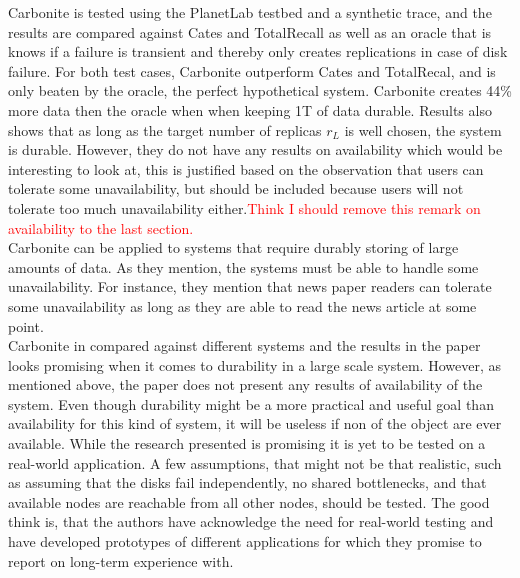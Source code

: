 \documentclass{article}
\begin{document}
\noindent Carbonite is tested using the PlanetLab testbed and a synthetic trace, and the results are compared against Cates and TotalRecall as well as an oracle that is knows if a failure is transient and thereby only creates replications in case of disk failure. For both test cases, Carbonite outperform Cates and TotalRecal, and is only beaten by the oracle, the perfect hypothetical system. Carbonite creates 44\% more data then the oracle when when keeping 1T of data durable. Results also shows that as long as the target number of replicas $r_L$ is well chosen, the system is durable. However, they do not have any results on availability which would be interesting to look at, this is justified based on the observation that users can tolerate some unavailability, but should be included because users will not tolerate too much unavailability either.\textcolor{red}{Think I should remove this remark on availability to the last section.}\\

\noindent Carbonite can be applied to systems that require durably storing of large amounts of data. As they mention, the systems must be able to handle some unavailability. For instance, they mention that news paper readers can tolerate some unavailability as long as they are able to read the news article at some point.\\

\noindent Carbonite in compared against different systems and the results in the paper looks promising when it comes to durability in a large scale system. However, as mentioned above, the paper does not present any results of availability of the system. Even though durability might be a more practical and useful goal than availability for this kind of system, it will be useless if non of the object are ever available. While the research presented is promising it is yet to be tested on a real-world application. A few assumptions, that might not be that realistic, such as assuming that the disks fail independently, no shared bottlenecks, and that available nodes are reachable from all other nodes, should be tested. The good think is, that the authors have acknowledge the need for real-world testing and have developed prototypes of different applications for which they promise to report on long-term experience with.  \\


\end{document}

